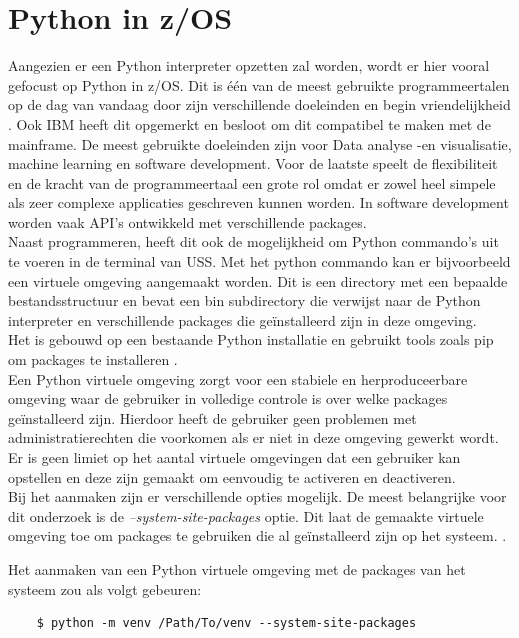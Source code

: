 \section{Python in z/OS}
Aangezien er een Python interpreter opzetten zal worden, wordt er hier vooral gefocust op Python in z/OS. Dit is één van de meest gebruikte programmeertalen op de dag van vandaag door zijn verschillende doeleinden en begin vriendelijkheid \autocite{Johnson2023}. Ook IBM heeft dit opgemerkt en besloot om dit compatibel te maken met de mainframe. De meest gebruikte doeleinden zijn voor Data analyse -en visualisatie, machine learning en software development. Voor de laatste speelt de flexibiliteit en de kracht van de programmeertaal een grote rol omdat er zowel heel simpele als zeer complexe applicaties geschreven kunnen worden. In software development worden vaak API's ontwikkeld met verschillende packages. \autocite{Kosourova2022} \\

Naast programmeren, heeft dit ook de mogelijkheid om Python commando's uit te voeren in de terminal van USS. Met het python commando kan er bijvoorbeeld een virtuele omgeving aangemaakt worden. Dit is een directory met een bepaalde bestandsstructuur en bevat een bin subdirectory die verwijst naar de Python interpreter en verschillende packages die geïnstalleerd zijn in deze omgeving.  \autocite{UniPrinceton2022} \\
Het is gebouwd op een bestaande Python installatie en gebruikt tools zoals pip om packages te installeren \autocite{PSF2024}. \\

Een Python virtuele omgeving zorgt voor een stabiele en herproduceerbare omgeving waar de gebruiker in volledige controle is over welke packages geïnstalleerd zijn. Hierdoor heeft de gebruiker geen problemen met administratierechten die voorkomen als er niet in deze omgeving gewerkt wordt. Er is geen limiet op het aantal virtuele omgevingen dat een gebruiker kan opstellen en deze zijn gemaakt om eenvoudig te activeren en deactiveren. \autocite{UniPrinceton2022} \\

Bij het aanmaken zijn er verschillende opties mogelijk. De meest belangrijke voor dit onderzoek is de \textit{--system-site-packages} optie. Dit laat de gemaakte virtuele omgeving toe om packages te gebruiken die al geïnstalleerd zijn op het systeem. \autocite{PSF2024}.

Het aanmaken van een Python virtuele omgeving met de packages van het systeem zou als volgt gebeuren:
\begin{lstlisting}
    $ python -m venv /Path/To/venv --system-site-packages
    
\end{lstlisting}

